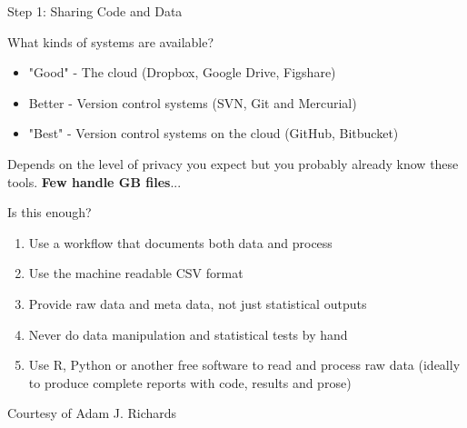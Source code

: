 \documentclass[11pt,xcolor=dvipsnames]{beamer}
\begin{document}
\begin{frame}[label=sec-3-2-4]{Step 1: Sharing Code and Data}
\begin{overlayarea}{\linewidth}{7.6cm}\null\vspace{-.6cm}
\begin{block}{What kinds of systems are available?}
\begin{itemize}
\item "Good" - The cloud (Dropbox, Google Drive, \alert{Figshare})
\item \alert{Better} - Version control systems (SVN, \alert{Git} and Mercurial)
\item "Best" - Version control systems on the cloud (GitHub, Bitbucket)
\end{itemize}

Depends on the level of privacy you expect but you probably already
know these tools. 
\hfill\textbf{\bf Few handle GB files}...\hfill\null
\end{block}\begin{block}{Is this enough?}
\begin{enumerate}
\item Use a workflow that \alert{documents both data and process}
\item Use the machine readable \alert{CSV format}
\item Provide \alert{raw} data and \alert{meta} data, not just statistical outputs
\item \alert{Never} do data manipulation and statistical tests \alert{by hand}
\item \alert{Use R}, Python or another free software to read and process raw
data (\alert{ideally} to \alert{produce complete reports} with code, results
and prose)
\end{enumerate}
\end{block}

\end{overlayarea} \begin{flushright}\scriptsize Courtesy of Adam J. Richards\end{flushright}
\end{frame}
\end{document}
